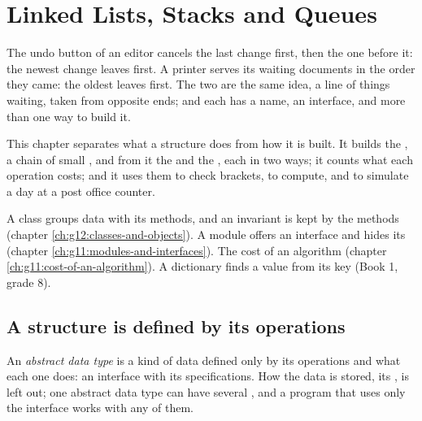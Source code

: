 \chapter{Linked Lists, Stacks and Queues}\label{ch:g12:lists-stacks-queues}

The undo button of an editor cancels the last change first, then the one before it: the newest change leaves
first. A printer serves its waiting documents in the order they came: the oldest leaves first. The two are the same
idea, a line of things waiting, taken from opposite ends; and each has a name, an interface, and more than one way to
build it.

This chapter separates what a structure does from how it is built. It builds the , a chain of small ,
and from it the  and the , each in two ways; it counts what each operation costs; and it uses them to check
brackets, to compute, and to simulate a day at a post office counter.

\begin{recall}
A class groups data with its methods, and an invariant is kept by the methods (chapter
\ref{ch:g12:classes-and-objects}). A module offers an interface and hides its  (chapter
\ref{ch:g11:modules-and-interfaces}). The cost of an algorithm (chapter \ref{ch:g11:cost-of-an-algorithm}). A
dictionary finds a value from its key (Book 1, grade 8).
\end{recall}

\section{A structure is defined by its operations}\label{sec:g12:lists-stacks-queues:adt}

\begin{definition}\label{def:g12:lists-stacks-queues:adt}
An \emph{abstract data type} is a kind of data defined only by its operations and what
each one does: an interface with its specifications. How the data is stored, its , is left out; one
abstract data type can have several , and a program that uses only the interface works with any of
them.
\end{definition}

